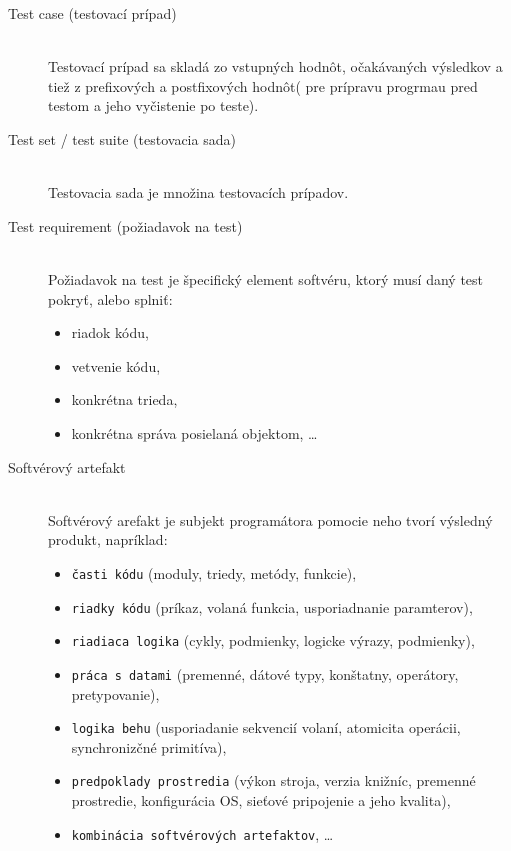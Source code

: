 \begin{description}
	\item[Test case (testovací prípad)] \hfill \\
		Testovací prípad sa skladá zo vstupných hodnôt, očakávaných výsledkov a tiež z prefixových a postfixových hodnôt( pre prípravu progrmau pred testom a jeho vyčistenie po teste).

	\item[Test set / test suite (testovacia sada)] \hfill \\
		Testovacia sada je množina testovacích prípadov.

	\item[Test requirement (požiadavok na test)] \hfill \\
		Požiadavok na test je špecifický element softvéru, ktorý musí daný test pokryť, alebo splniť: 
		\begin{itemize}
			\item riadok kódu, 
			\item vetvenie kódu, 
			\item konkrétna trieda, 
			\item konkrétna správa posielaná objektom, \dots
		\end{itemize}

	\item[Softvérový artefakt] \hfill \\
		Softvérový arefakt je subjekt programátora pomocie neho tvorí výsledný produkt, napríklad: 
		\begin{itemize}
			\item \texttt{časti kódu} (moduly, triedy, metódy, funkcie), 
			\item \texttt{riadky kódu} (príkaz, volaná funkcia, usporiadnanie paramterov), 
			\item \texttt{riadiaca logika} (cykly, podmienky, logicke výrazy, podmienky), 
			\item \texttt{práca s datami} (premenné, dátové typy, konštatny, operátory, pretypovanie), 
			\item \texttt{logika behu} (usporiadanie sekvencií volaní, atomicita operácii, synchronizčné primitíva), 
			\item \texttt{predpoklady prostredia} (výkon stroja, verzia knižníc, premenné prostredie, konfigurácia OS, sieťové pripojenie a jeho kvalita), 
			\item \texttt{kombinácia softvérových artefaktov}, \dots
		\end{itemize}


\end{description}
